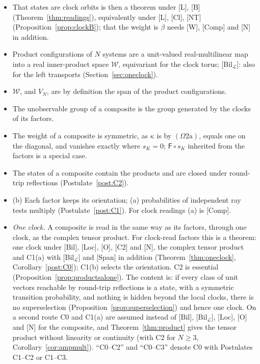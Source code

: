 \documentclass[aps,pra,onecolumn,superscriptaddress,nofootinbib,10pt]{revtex4-2}
\theoremstyle{definition}
\theoremstyle{remark}
\newcommand{\cL}{\mathcal{L}}
\begin{document}
\begin{itemize}[leftmargin=1.6em]
multiply (Definition~\ref{def:reading}).
\item[] That states are clock orbits is then a theorem under [L], [B] (Theorem~\ref{thm:readings}), equivalently
under [L], [Cl], [NT] (Proposition~\ref{prop:clockB}); that the weight is $\beta$ needs [W], [Comp] and [N] in
addition.
\item[{[Bil]}] Product configurations of $N$ systems are a unit-valued real-multilinear map into a real
inner-product space $\mathcal W$, equivariant for the clock torus; [Bil$_\cL$]: also for the left transports
(Section~\ref{sec:oneclock}).
\item[{[Span]}] $\mathcal W$, and $V_N$, are by definition the span of the product configurations.
\item[{[Loc]}] The unobservable group of a composite is the group generated by the clocks of its factors.
\item[{[O]}] The weight of a composite is symmetric, as $\kappa$ is by $(\Omega2\mathrm a)$, equals one on the diagonal,
and vanishes exactly where $s_K=0$; $\mathsf F\circ s_K$ inherited from the factors is a special case.
\item[{[C2]}] The states of a composite contain the products and are closed under round-trip reflections
(Postulate~\ref{post:C2}).
\item[{[C1]}] (b) Each factor keeps its orientation; (a) probabilities of independent ray tests multiply
(Postulate~\ref{post:C1}).  For clock readings (a) is [Comp].
\item[{[C0]}] \emph{One clock.}  A composite is read in the same way as its factors, through one clock, as the
complex tensor product.  For clock-read factors this is a theorem: one clock under [Bil], [Loc], [O],
[C2] and [N], the complex tensor product and C1(a) with [Bil$_\cL$] and [Span] in addition
(Theorem~\ref{thm:oneclock}, Corollary~\ref{post:C0}); C1(b) selects the orientation.  C2 is essential
(Proposition~\ref{prop:productsalone}).  The content is: if every class of unit vectors reachable by
round-trip reflections is a state, with a symmetric transition probability, and nothing is hidden beyond
the local clocks, there is no superselection (Proposition~\ref{prop:superselection}) and hence one clock.  On a
second route C0 and C1(a) are assumed instead of [Bil], [Bil$_\cL$], [Loc], [O] and [N] for the composite, and
Theorem~\ref{thm:product} gives the tensor product without linearity or continuity (with C2 for $N\ge3$,
Corollary~\ref{cor:ampmult}).  ``C0--C2'' and ``C0--C3'' denote C0 with
Postulates C1--C2 or C1--C3.

\end{itemize}
\end{document}
